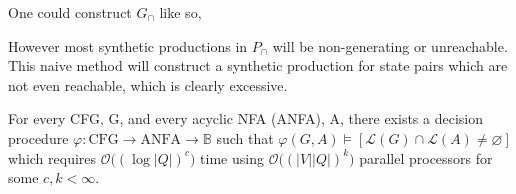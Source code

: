 \documentclass[sigplan,review,acmsmall,nonacm,screen,anonymous]{acmart}\settopmatter{printfolios=false,printccs=false,printacmref=false}
\begin{document}
  \begin{definition}[Salomaa, 1973]
    One could construct $G_\cap$ like so,

    \noindent{}
  \end{definition}

  However most synthetic productions in $P_\cap$ will be non-generating or unreachable. This naive method will construct a synthetic production for state pairs which are not even reachable, which is clearly excessive.

  \begin{theorem}%
    For every CFG, G, and every acyclic NFA (ANFA), A, there exists a decision procedure $\varphi: \text{CFG} \rightarrow \text{ANFA} \rightarrow \mathbb{B}$ such that $\varphi(G, A) \models [\mathcal{L}(G)\cap\mathcal{L}(A) \neq \varnothing]$ which requires $\mathcal{O}\big((\log |Q|)^c\big)$ time using $\mathcal{O}\big((|V||Q|)^k\big)$ parallel processors for some $c, k < \infty$.
  \end{theorem}
\end{document}
